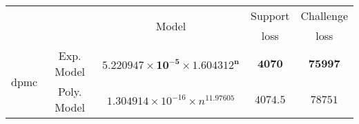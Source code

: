 \begin{tabular}{ccccc} 
\hline 
 &  & \multirow{2}{*}{Model} & Support & Challenge\tabularnewline 
 &  &  & loss  & loss\tabularnewline 
\hline 
\hline 
\multirow{2}{*}{dpmc} & Exp. Model & $\mathbf{5.220947\times10^{-5}\times 1.604312^{n}}$ & $\mathbf{4070}$ & $\mathbf{75997}$ \tabularnewline 
 & Poly. Model & $1.304914\times10^{-16}\times n^{11.97605}$ & $4074.5$ & $78751$ \tabularnewline 
\hline 
\end{tabular} 

